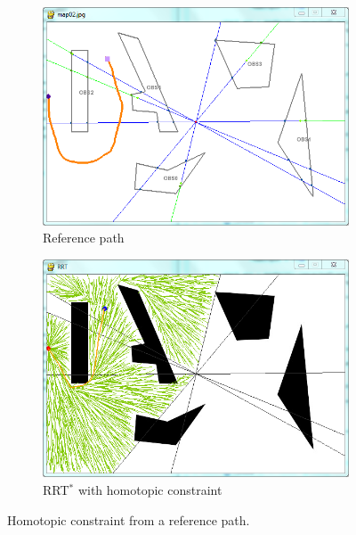\documentclass[letterpaper, 10 pt, conference]{ieeeconf}
\begin{document}
\begin{figure}
	\centering
	\begin{subfigure}[t]{0.47\linewidth}
		\centering
		\includegraphics[width=\textwidth]{fig/referenceHomotopy.png}
		\caption{Reference path}
		\label{fig:reference_path:reference}
	\end{subfigure}  
	\begin{subfigure}[t]{0.47\linewidth}
		\centering
		\includegraphics[width=\textwidth]{fig/homotopicConstrainedRRT.png}
		\caption{RRT$^{*}$ with homotopic constraint}
		\label{fig:reference_path:rrt}
	\end{subfigure}   
	\caption{Homotopic constraint from a reference path.}
	\label{fig:reference_path}
\end{figure}
\end{document}
